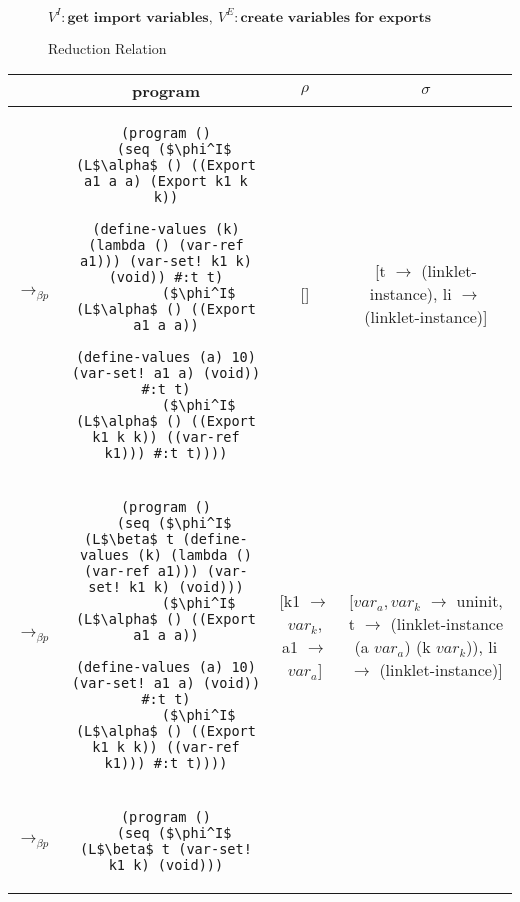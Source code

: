 \begin{figure}[h!]
\begin{mdframed}
    \footnotesize $\mathit{V}^I : \textbf{get  import variables},\: \mathit{V}^E : \textbf{create variables for exports}$
    \caption[ccc]{Reduction Relation \footnotemark}
    \label{fig:reduction}
  \end{mdframed}
\end{figure}

\begin{adjustbox}{center}
  \footnotesize
  \begin{tabular}{lc|c|c}
    &\textbf{program} & \textbf{$\rho$} & \textbf{$\sigma$} \\ \hline \hline
    $\longrightarrow_{\beta p}$&\begin{lstlisting}[mathescape]
(program ()
  (seq ($\phi^I$ (L$\alpha$ () ((Export a1 a a) (Export k1 k k))
                (define-values (k) (lambda () (var-ref a1))) (var-set! k1 k) (void)) #:t t)
        ($\phi^I$ (L$\alpha$ () ((Export a1 a a))
                (define-values (a) 10) (var-set! a1 a) (void)) #:t t)
        ($\phi^I$ (L$\alpha$ () ((Export k1 k k)) ((var-ref k1))) #:t t))))
    \end{lstlisting} & [] & \thead{[t $\rightarrow$ (linklet-instance), \\li $\rightarrow$ (linklet-instance)]} \\ \hline
    $\longrightarrow_{\beta p}$&\begin{lstlisting}[mathescape]
(program ()
  (seq ($\phi^I$ (L$\beta$ t (define-values (k) (lambda () (var-ref a1))) (var-set! k1 k) (void)))
        ($\phi^I$ (L$\alpha$ () ((Export a1 a a))
                (define-values (a) 10) (var-set! a1 a) (void)) #:t t)
        ($\phi^I$ (L$\alpha$ () ((Export k1 k k)) ((var-ref k1))) #:t t))))
    \end{lstlisting} & \thead{[k1 $\rightarrow$ $var_k$, \\a1 $\rightarrow$ $var_a$]} & \thead{[$var_a,var_k$ $\rightarrow$ uninit,\\ t $\rightarrow$ (linklet-instance \\ (a $var_a$) (k $var_k$)), \\li $\rightarrow$ (linklet-instance)]} \\ \hline
    $\longrightarrow_{\beta p}$&\begin{lstlisting}[mathescape]
(program ()
  (seq ($\phi^I$ (L$\beta$ t (var-set! k1 k) (void)))

\end{lstlisting}
\end{tabular}
\end{adjustbox}
